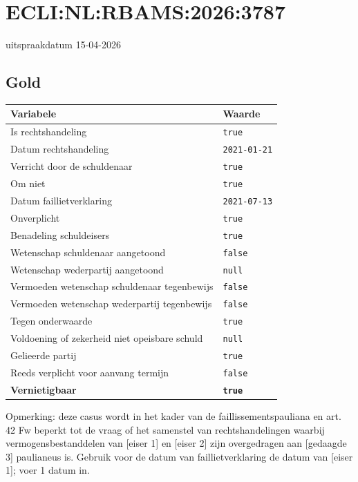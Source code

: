 \documentclass[
  dutch,
  a4paper,
]{article}
\begin{document}
\section{ECLI:NL:RBAMS:2026:3787}\label{eclinlrbams20263787}

uitspraakdatum 15-04-2026

\subsection{Gold}\label{gold-2}

\begin{center}
\small
\begin{tabular}{@{}p{8cm}p{2.6cm}@{}}
\toprule
Variabele & Waarde \\
\midrule
Is rechtshandeling & \texttt{true} \\
Datum rechtshandeling & \texttt{2021-01-21} \\
Verricht door de schuldenaar & \texttt{true} \\
Om niet & \texttt{true} \\
Datum faillietverklaring & \texttt{2021-07-13} \\
Onverplicht & \texttt{true} \\
Benadeling schuldeisers & \texttt{true} \\
Wetenschap schuldenaar aangetoond & \texttt{false} \\
Wetenschap wederpartij aangetoond & \texttt{null} \\
Vermoeden wetenschap schuldenaar tegenbewijs & \texttt{false} \\
Vermoeden wetenschap wederpartij tegenbewijs & \texttt{false} \\
Tegen onderwaarde & \texttt{true} \\
Voldoening of zekerheid niet opeisbare schuld & \texttt{null} \\
Gelieerde partij & \texttt{true} \\
Reeds verplicht voor aanvang termijn & \texttt{false} \\
\textbf{Vernietigbaar} & \textbf{\texttt{true}} \\
\bottomrule
\end{tabular}
\end{center}

Opmerking: deze casus wordt in het kader van de faillissementspauliana en art. 42 Fw beperkt tot de vraag of het samenstel van rechtshandelingen waarbij vermogensbestanddelen van {[}eiser 1{]} en {[}eiser 2{]} zijn overgedragen aan {[}gedaagde 3{]} paulianeus is.
Gebruik voor de datum van faillietverklaring de datum van {[}eiser 1{]}; voer 1 datum in.
\end{document}
